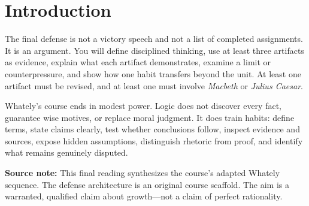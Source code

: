 \documentclass[12pt]{article}
\newcommand{\focusbox}[1]{\par\vspace{0.4em}\noindent\begingroup\setlength{\fboxsep}{6pt}\colorbox{gray!12}{\begin{minipage}{\dimexpr\linewidth-2\fboxsep\relax}#1\end{minipage}}\endgroup\par\vspace{0.5em}}
\begin{document}
\section*{Introduction}
The final defense is not a victory speech and not a list of completed assignments. It is an argument. You will define disciplined thinking, use at least three artifacts as evidence, explain what each artifact demonstrates, examine a limit or counterpressure, and show how one habit transfers beyond the unit. At least one artifact must be revised, and at least one must involve \textit{Macbeth} or \textit{Julius Caesar}.

Whately's course ends in modest power. Logic does not discover every fact, guarantee wise motives, or replace moral judgment. It does train habits: define terms, state claims clearly, test whether conclusions follow, inspect evidence and sources, expose hidden assumptions, distinguish rhetoric from proof, and identify what remains genuinely disputed.

\focusbox{\textbf{Source note:} This final reading synthesizes the course's adapted Whately sequence. The defense architecture is an original course scaffold. The aim is a warranted, qualified claim about growth---not a claim of perfect rationality.}
\end{document}
